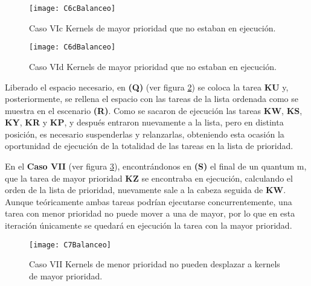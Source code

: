     \begin{figure}[!]
      \centering
        \texttt{[image: C6cBalanceo]}
        \caption{Caso VIc Kernels de mayor prioridad que no estaban en ejecución.}
        \label{fig:C6cBalanceo}
    \end{figure}

    
    \begin{figure}[!]
      \centering
        \texttt{[image: C6dBalanceo]}
        \caption{Caso VId Kernels de mayor prioridad que no estaban en ejecución.}
        \label{fig:C6dBalanceo}
    \end{figure}

   Liberado el espacio necesario, en \textbf{(Q)} (ver figura \ref{fig:C6dBalanceo}) se coloca la tarea \textbf{KU} y, posteriormente, se rellena el espacio con las tareas de la lista ordenada como se muestra en el escenario \textbf{(R)}. 
   Como se sacaron de ejecución las tareas \textbf{KW}, \textbf{KS}, \textbf{KY}, \textbf{KR} y \textbf{KP}, y después entraron nuevamente a la lista, pero en distinta posición, es necesario suspenderlas y relanzarlas, obteniendo esta ocasión la oportunidad de ejecución de la totalidad de las tareas en la lista de prioridad.
\newline

    En el \textbf{Caso VII} (ver figura \ref{fig:C7Balanceo}), encontrándonos en \textbf{(S)} el final de un quantum m, que la tarea de mayor prioridad \textbf{KZ} se encontraba en ejecución, calculando el orden de la lista de prioridad, nuevamente sale a la cabeza seguida de \textbf{KW}. Aunque teóricamente ambas tareas podrían ejecutarse concurrentemente, una tarea con menor prioridad no puede mover a una de mayor, por lo que en esta iteración únicamente se quedará en ejecución la tarea con la mayor prioridad.
    
    \begin{figure}[!]
      \centering
        \texttt{[image: C7Balanceo]}
        \caption{Caso VII Kernels de menor prioridad no pueden desplazar a kernels de mayor prioridad.}
        \label{fig:C7Balanceo}
    \end{figure}
    
